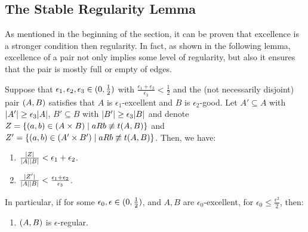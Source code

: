 
    \subsection{The Stable Regularity Lemma} \label{subsec:subsection_5.3}

        As mentioned in the beginning of the section, it can be proven that excellence is a stronger condition then
        regularity.
        In fact, as shown in the following lemma, excellence of a pair not only implies some level of regularity, but
        also it ensures that the pair is mostly full or empty of edges.

        \begin{lemma} \label{lem:excellence_implies_regularity}
            Suppose that $\epsilon_1, \epsilon_2, \epsilon_3 \in ( 0, \frac{1}{2} )$ with
            $\frac{\epsilon_1 + \epsilon_2}{\epsilon_3} < \frac{1}{2}$ and the (not necessarily disjoint) pair $( A,B )$ satisfies that
            $A$ is $\epsilon_1$-excellent and $B$ is $\epsilon_2$-good.
            Let $A' \subseteq A$ with $| A' | \geq \epsilon_3 | A |$,
            $B' \subseteq B$ with $| B' | \geq \epsilon_3 | B |$ and
            denote $Z = \{ ( a,b ) \in ( A \times B ) \mid a R b \not\equiv t( A,B ) \}$ and
            $Z' = \{ ( a,b ) \in ( A' \times B' ) \mid a R b \not\equiv t( A,B ) \}$.
            Then, we have:
            \begin{enumerate}
                \item \label{itm:excellence_implies_regularity.1} $\frac{| Z |}{{| A | | B |}} < \epsilon_1 + \epsilon_2$.
                \item \label{itm:excellence_implies_regularity.2} $\frac{| Z' |}{| A | | B |} <
                    \frac{\epsilon_1 + \epsilon_2}{\epsilon_3}$.
            \end{enumerate}
            In particular, if for some $\epsilon_0, \epsilon \in ( 0, \frac{1}{2} )$, and $A, B$ are $\epsilon_0$-excellent,
            for $\epsilon_0 \leq \frac{\epsilon^2}{2}$, then:
            \begin{enumerate}[label=\alph*., ref=\alph*]
                \item \label{itm:excellence_implies_regularity.a} $( A,B )$ is $\epsilon$-regular.

\end{enumerate}
\end{lemma}
